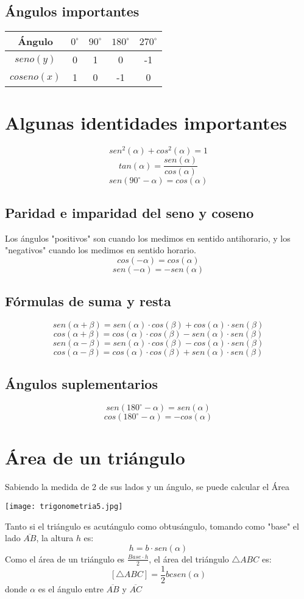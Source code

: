 \subsection{Ángulos importantes}
\begin{tabular}{c||c||c||c||c}
    {\bf Ángulo} & {\bf $0^\circ$} & {\bf $90^\circ$} & {\bf $180^\circ$} & {\bf $270^\circ$} \\
    \hline
    \hline
    {\bf $seno (y)$} & 0 & 1 & 0 & -1\\
    {\bf $coseno (x)$} & 1 & 0 & -1 & 0
\end{tabular}

\section{Algunas identidades importantes}
$$sen^2(\alpha) + cos^2(\alpha) = 1$$
$$tan(\alpha) = \frac{sen(\alpha)}{cos(\alpha)}$$
$$sen(90^\circ - \alpha) = cos(\alpha)$$

\subsection{Paridad e imparidad del seno y coseno}
Los ángulos "positivos" son cuando los medimos en sentido antihorario, y los "negativos" cuando los medimos en sentido horario.
$$cos(-\alpha) = cos(\alpha)$$
$$sen(-\alpha) = -sen(\alpha)$$

\subsection{Fórmulas de suma y resta}
$$sen(\alpha + \beta) = sen(\alpha) \cdot cos(\beta) + cos(\alpha) \cdot sen(\beta)$$
$$cos(\alpha + \beta) = cos(\alpha) \cdot cos(\beta) - sen(\alpha) \cdot sen(\beta)$$
$$sen(\alpha - \beta) = sen(\alpha) \cdot cos(\beta) - cos(\alpha) \cdot sen(\beta)$$
$$cos(\alpha - \beta) = cos(\alpha) \cdot cos(\beta) + sen(\alpha) \cdot sen(\beta)$$

\subsection{Ángulos suplementarios}
$$sen(180^\circ - \alpha) = sen(\alpha)$$
$$cos(180^\circ - \alpha) = -cos(\alpha)$$

\section{Área de un triángulo}
Sabiendo la medida de 2 de sus lados y un ángulo, se puede calcular el Área
\begin{center}
    \texttt{[image: trigonometria5.jpg]}
\end{center}
Tanto si el triángulo es acutángulo como obtusángulo, tomando como "base" el lado $\overline{AB}$, la altura $h$ es:
$$h = b \cdot sen(\alpha)$$
Como el área de un triángulo es $\frac{Base \cdot h}{2}$, el área del triángulo $\triangle ABC$ es:
$$\left[\triangle ABC\right] = \frac{1}{2} b c sen(\alpha)$$
donde $\alpha$ es el ángulo entre $\overline{AB}$ y $\overline{AC}$

